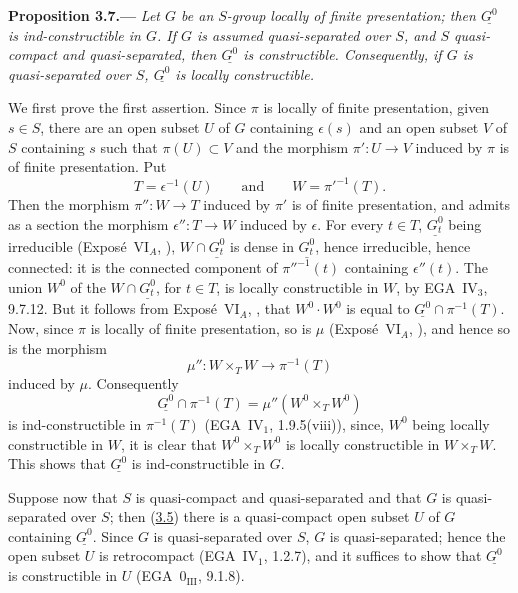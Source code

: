 
\medskip
{}\label{prop:sga3-VIB-3.7}%
\noindent\textbf{Proposition 3.7.---}
\emph{Let \(G\) be an \(S\)-group locally of finite presentation; then
\(\underline{G^0}\) is ind-constructible in \(G\). If \(G\) is assumed
quasi-separated over \(S\), and \(S\) quasi-compact and quasi-separated,
then \(\underline{G^0}\) is constructible. Consequently, if \(G\) is
quasi-separated over \(S\), \(\underline{G^0}\) is locally
constructible.}

We first prove the first assertion. Since \(\pi\) is locally of finite
presentation, given \(s\in S\), there are an open subset \(U\) of \(G\)
containing \(\epsilon(s)\) and an open subset \(V\) of \(S\) containing
\(s\) such that \(\pi(U)\subset V\) and the morphism \(\pi':U\to V\)
induced by \(\pi\) is of finite presentation. Put
\[
  T=\epsilon^{-1}(U)
  \qquad\text{and}\qquad
  W=\pi'^{-1}(T).
\]
Then the morphism \(\pi'':W\to T\) induced by \(\pi'\) is of finite
presentation, and admits as a section the morphism
\(\epsilon'':T\to W\) induced by \(\epsilon\). For every \(t\in T\),
\(\underline{G_t^0}\) being irreducible (Expos\'e~VI\(_A\), ),
\(W\cap\underline{G_t^0}\) is dense in \(\underline{G_t^0}\), hence
irreducible, hence connected: it is the connected component of
\(\pi''^{-1}(t)\) containing \(\epsilon''(t)\). The union \(W^0\) of the
\(W\cap\underline{G_t^0}\), for \(t\in T\), is locally constructible in
\(W\), by EGA~IV\(_3\), 9.7.12. But it follows from
Expos\'e~VI\(_A\), , that \(W^0\cdot W^0\) is equal to
\(\underline{G^0}\cap\pi^{-1}(T)\). Now, since \(\pi\) is locally of finite
presentation, so is \(\mu\) (Expos\'e~VI\(_A\), ), and hence so is
the morphism
\[
  \mu'':W\times_T W\longrightarrow\pi^{-1}(T)
\]
induced by \(\mu\). Consequently
\[
  \underline{G^0}\cap\pi^{-1}(T)=\mu''(W^0\times_T W^0)
\]
is ind-constructible in \(\pi^{-1}(T)\) (EGA~IV\(_1\), 1.9.5(viii)), since,
\(W^0\) being locally constructible in \(W\), it is clear that
\(W^0\times_T W^0\) is locally constructible in \(W\times_T W\). This
shows that \(\underline{G^0}\) is ind-constructible in \(G\).

Suppose now that \(S\) is quasi-compact and quasi-separated and that
\(G\) is quasi-separated over \(S\); then (\hyperref[prop:sga3-VIB-3.5]{3.5}) there is a
quasi-compact open subset \(U\) of \(G\) containing
\(\underline{G^0}\). Since
\(G\) is quasi-separated over \(S\), \(G\) is quasi-separated;
hence the open subset \(U\) is retrocompact (EGA~IV\(_1\), 1.2.7),
and it suffices to show that \(\underline{G^0}\) is constructible
in \(U\)
(EGA~0\(_{\mathrm{III}}\), 9.1.8).

